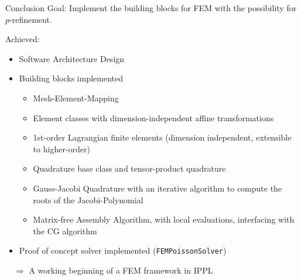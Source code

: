 \documentclass[xcolor=pdftex,table,10pt,yellow,mathserif]{beamer}
\begin{document}
\begin{frame}{Conclusion}
    Goal: Implement the building blocks for FEM with the possibility for $p$-refinement.\\

    \pause

    Achieved:\pause
    \begin{itemize}
        \item Software Architecture Design\pause
        \item Building blocks implemented\pause
              \begin{itemize}
                  \item Mesh-Element-Mapping\pause
                  \item Element classes with dimension-independent affine transformations\pause
                  \item 1st-order Lagrangian finite elements (dimension independent, extensible to higher-order)\pause
                  \item Quadrature base class and tensor-product quadrature\pause
                  \item Gauss-Jacobi Quadrature with an iterative algorithm to compute the roots of the Jacobi-Polynomial\pause
                  \item Matrix-free Assembly Algorithm, with local evaluations, interfacing with the CG algorithm
              \end{itemize}
              \pause
        \item Proof of concept solver implemented (\texttt{FEMPoissonSolver})
    \end{itemize}
    \pause

    $\quad \Rightarrow$ A working beginning of a FEM framework in IPPL

    \vspace*{0.5cm}

\end{frame}
\end{document}
